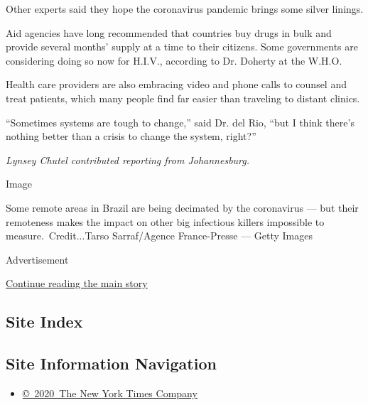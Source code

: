 Other experts said they hope the coronavirus pandemic brings some silver
linings.

Aid agencies have long recommended that countries buy drugs in bulk and
provide several months' supply at a time to their citizens. Some
governments are considering doing so now for H.I.V., according to Dr.
Doherty at the W.H.O.

Health care providers are also embracing video and phone calls to
counsel and treat patients, which many people find far easier than
traveling to distant clinics.

``Sometimes systems are tough to change,'' said Dr. del Rio, ``but I
think there's nothing better than a crisis to change the system,
right?''

\emph{Lynsey Chutel contributed reporting from Johannesburg.}

Image

Some remote areas in Brazil are being decimated by the coronavirus ---
but their remoteness makes the impact on other big infectious killers
impossible to measure.~Credit...Tarso Sarraf/Agence France-Presse ---
Getty Images

Advertisement

\protect\hyperlink{after-bottom}{Continue reading the main story}

\hypertarget{site-index}{%
\subsection{Site Index}\label{site-index}}

\hypertarget{site-information-navigation}{%
\subsection{Site Information
Navigation}\label{site-information-navigation}}

\begin{itemize}
\tightlist
\item
  \href{https://help.nytimes3xbfgragh.onion/hc/en-us/articles/115014792127-Copyright-notice}{©~2020~The
  New York Times Company}
\end{itemize}


